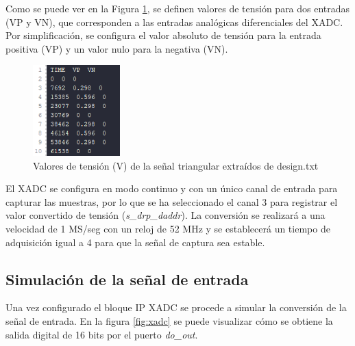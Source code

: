 Como se puede ver en la Figura \ref{fig:design}, se definen valores de tensión para dos entradas (VP y VN), que corresponden a las entradas analógicas diferenciales del XADC. Por simplificación, se configura el valor absoluto de tensión para la entrada positiva (VP) y un valor nulo para la negativa (VN). 

\vspace{3mm}

\begin{figure}[h]
    \centering
    \includegraphics[width=0.3\textwidth]{img/diseno/design.PNG}
    \caption{Valores de tensión (V) de la señal triangular extraídos de design.txt}
    \label{fig:design}
\end{figure}
    
\vspace{3mm}


El XADC se configura en modo continuo y con un único canal de entrada para capturar las muestras, por lo que se ha seleccionado el canal 3 para registrar el valor convertido de tensión (\textit{s\_drp\_daddr}). La conversión se realizará a una velocidad de 1 MS/seg con un reloj de 52 MHz y se establecerá un tiempo de adquisición igual a 4 para que la señal de captura sea estable.

\subsection{Simulación de la señal de entrada}

Una vez configurado el bloque IP XADC se procede a simular la conversión de la señal de entrada. En la figura \ref{fig:xadc} se puede visualizar cómo se obtiene la salida digital de 16 bits por el puerto \textit{do\_out}.

\vspace{3mm}

